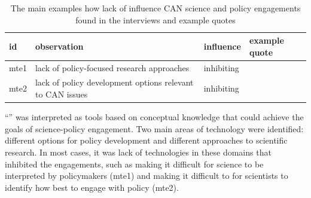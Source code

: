 \begin{table}[!ht]
\footnotesize
\caption{The main examples how lack of \ismmt{} influence CAN science and policy engagements found in the interviews and example quotes}\label{tab:restechnologies}
\begin{tabular}{L{.06\linewidth}L{.3\linewidth}L{.12\linewidth}L{.52\linewidth}} \hline
\textbf{id} & \textbf{observation} & \textbf{influence} & \textbf{example quote} \\ \hline \hline 
mte1 & lack of policy-focused research approaches & inhibiting &  \\[5mm]
mte2 & lack of policy development options relevant to CAN issues & inhibiting &  \\[5mm]\hline
\end{tabular}
\end{table}
		
``\ismmt'' was interpreted as tools based on conceptual knowledge that could achieve the goals of science-policy engagement. Two main areas of technology were identified: different options for policy development and different approaches to scientific research. In most cases, it was lack of technologies in these domains that inhibited the engagements, such as making it difficult for science to be interpreted by policymakers (mte1) and making it difficult to for scientists to identify how best to engage with policy (mte2).

